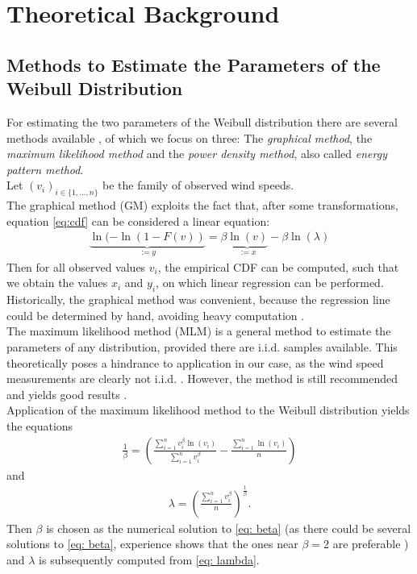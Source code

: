 \documentclass{article}
\theoremstyle{plain}
\theoremstyle{definition}
\theoremstyle{remark}
\begin{document}
\iffalse
\section{Theoretical Background}

\subsection{Methods to Estimate the Parameters of the Weibull Distribution}

For estimating the two parameters of the Weibull distribution there are several methods available \citep{compestimators},  
of which we focus on three: The \emph{graphical method}, the \emph{maximum likelihood method} and the \emph{power density method}, also called \emph{energy pattern method}. \\
Let $(v_i)_{i \in \{1, \dots, n\}}$ be the family of observed wind speeds. \\
The graphical method (GM) exploits the fact that, after some transformations, 
equation \ref{eq:cdf} can be considered a linear equation: 
\begin{align}
    \underbrace{\ln ( - \ln (1- F(v))}_{:= y}= \beta \underbrace{\ln(v)}_{:=x}- \beta \ln(\lambda)
\end{align}
Then for all observed values $v_i$, the empirical CDF can be computed, 
such that we obtain the values $x_i$ and $y_i$, on which linear regression can be performed.  
Historically, the graphical method was convenient, because the regression line could be
determined by hand, avoiding heavy computation \citep{graphical}. \\

The maximum likelihood method (MLM) is a general method to estimate the parameters of any distribution, provided there are i.i.d. samples available.
This theoretically poses a hindrance to application in our case, as the wind speed measurements are clearly not i.i.d. . However, the method is still recommended and yields good results \citep{compestimators, graphical}.\\
Application of the maximum likelihood method to the Weibull distribution yields the equations
\begin{align}
    \frac{1}{\beta}=
    \left( \frac{\sum_{i=1}^n v_i^\beta\ln(v_i)}{\sum_{i=1}^n v_i^\beta}
    - \frac{\sum_{i=1}^n \ln(v_i)}{n}
    \right)
    \label{eq: beta}
\end{align}
and 
\begin{align}
    \lambda = \left( \frac{\sum_{i=1}^n v_i^\beta}{n}  \right)^{\frac{1}{\beta}}.
    \label{eq: lambda}
\end{align}
Then $\beta$ is chosen as the numerical solution to \ref{eq: beta}
(as there could be several solutions to \ref{eq: beta}, experience shows that the ones near $\beta=2$ are preferable \citep{newestimator})
and $\lambda$ is subsequently computed from \ref{eq: lambda}. \\
\end{document}
